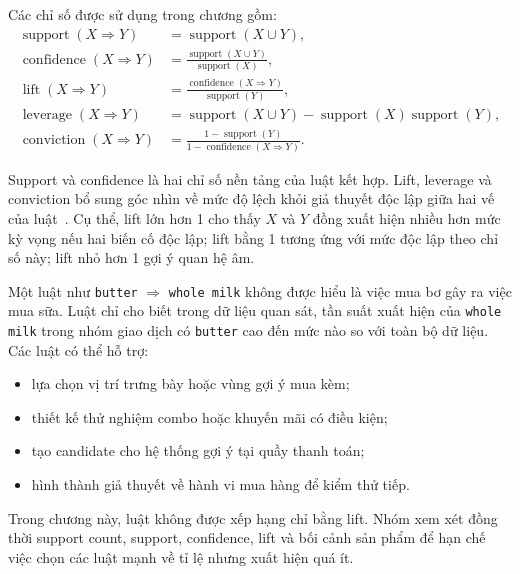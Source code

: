 Các chỉ số được sử dụng trong chương gồm:
\begin{align}
    \operatorname{support}(X \Rightarrow Y)
    &=
    \operatorname{support}(X \cup Y),
    \label{eq:application-rule-support}\\
    \operatorname{confidence}(X \Rightarrow Y)
    &=
    \frac{\operatorname{support}(X \cup Y)}
         {\operatorname{support}(X)},
    \label{eq:application-confidence}\\
    \operatorname{lift}(X \Rightarrow Y)
    &=
    \frac{\operatorname{confidence}(X \Rightarrow Y)}
         {\operatorname{support}(Y)},
    \label{eq:application-lift}\\
    \operatorname{leverage}(X \Rightarrow Y)
    &=
    \operatorname{support}(X \cup Y)
    -
    \operatorname{support}(X)\operatorname{support}(Y),
    \label{eq:application-leverage}\\
    \operatorname{conviction}(X \Rightarrow Y)
    &=
    \frac{1-\operatorname{support}(Y)}
         {1-\operatorname{confidence}(X \Rightarrow Y)}.
    \label{eq:application-conviction}
\end{align}

Support và confidence là hai chỉ số nền tảng của luật kết hợp. Lift, leverage
và conviction bổ sung góc nhìn về mức độ lệch khỏi giả thuyết độc lập giữa hai
vế của luật~\cite{brin1997dynamic,hahsler2005arules}. Cụ thể, lift lớn hơn 1
cho thấy $X$ và $Y$ đồng xuất hiện nhiều hơn mức kỳ vọng nếu hai biến cố độc
lập; lift bằng 1 tương ứng với mức độc lập theo chỉ số này; lift nhỏ hơn 1 gợi
ý quan hệ âm.

Một luật như
\texttt{butter} $\Rightarrow$ \texttt{whole milk}
không được hiểu là việc mua bơ gây ra việc mua sữa. Luật chỉ cho biết trong dữ
liệu quan sát, tần suất xuất hiện của \texttt{whole milk} trong nhóm giao dịch
có \texttt{butter} cao đến mức nào so với toàn bộ dữ liệu. Các luật có thể hỗ
trợ:
\begin{itemize}
    \item lựa chọn vị trí trưng bày hoặc vùng gợi ý mua kèm;
    \item thiết kế thử nghiệm combo hoặc khuyến mãi có điều kiện;
    \item tạo candidate cho hệ thống gợi ý tại quầy thanh toán;
    \item hình thành giả thuyết về hành vi mua hàng để kiểm thử tiếp.
\end{itemize}

Trong chương này, luật không được xếp hạng chỉ bằng lift. Nhóm xem xét đồng
thời support count, support, confidence, lift và bối cảnh sản phẩm để hạn chế
việc chọn các luật mạnh về tỉ lệ nhưng xuất hiện quá ít.

